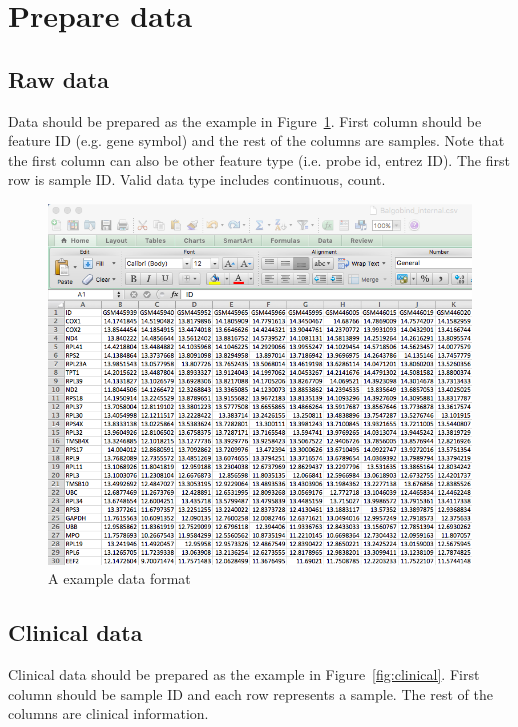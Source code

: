 
\section{Prepare data}
\label{sec:dataPrepare}
\subsection{Raw data}

Data should be prepared as the example in Figure~\ref{fig:dataMicroarray}.
First column should be feature ID (e.g. gene symbol) and the rest of the columns are samples.
Note that the first column can also be other feature type (i.e. probe id, entrez ID).
The first row is sample ID.
Valid data type includes continuous, count.

\begin{figure}[H]
\begin{center}
\includegraphics[scale=0.5]{./figure/dataPreparation/dataMicroarray}
\caption{A example data format}
\label{fig:dataMicroarray}
\end{center}
\end{figure}

\subsection{Clinical data}

Clinical data should be prepared as the example in Figure~\ref{fig:clinical}.
First column should be sample ID and each row represents a sample.
The rest of the columns are clinical information.

